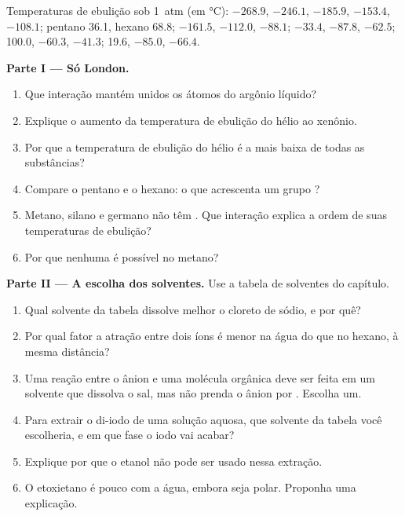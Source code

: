 \begin{problem}
\label{pb:b1:intermolecular-forces-solvents:1}
Temperaturas de ebulição sob \qty{1}{atm} (em \unit{\celsius}):  $-268.9$,
 $-246.1$,  $-185.9$,  $-153.4$,  $-108.1$;
pentano 36.1, hexano 68.8;  $-161.5$,  $-112.0$,
 $-88.1$;  $-33.4$,  $-87.8$,  $-62.5$;
 100.0,  $-60.3$,  $-41.3$;  19.6,
 $-85.0$,  $-66.4$.

\medskip
\noindent\textbf{Parte I --- Só London.}
\begin{enumerate}
  \item Que interação mantém unidos os átomos do argônio líquido?
  \item Explique o aumento da temperatura de ebulição do hélio ao xenônio.
  \item Por que a temperatura de ebulição do hélio é a mais baixa de
        todas as substâncias?
  \item Compare o pentano e o hexano: o que acrescenta um grupo ?
  \item Metano, silano e germano não têm . Que
        interação explica a ordem de suas temperaturas de ebulição?
  \item Por que nenhuma  é possível no metano?
\end{enumerate}

\medskip
\noindent\textbf{Parte II --- A escolha dos solventes.}
Use a tabela de solventes do capítulo.
\begin{enumerate}[resume]
  \item Qual solvente da tabela dissolve melhor o cloreto de sódio, e
        por quê?
  \item Por qual fator a atração entre dois íons é menor na água do que
        no hexano, à mesma distância?
  \item Uma reação entre o ânion  e uma molécula orgânica deve
        ser feita em um solvente que dissolva o sal, mas não prenda o
        ânion por . Escolha um.
  \item Para extrair o di-iodo de uma solução aquosa, que solvente da
        tabela você escolheria, e em que fase o iodo vai acabar?
  \item Explique por que o etanol não pode ser usado nessa extração.
  \item O etoxietano é pouco  com a água, embora seja polar.
        Proponha uma explicação.
\end{enumerate}


\end{problem}
